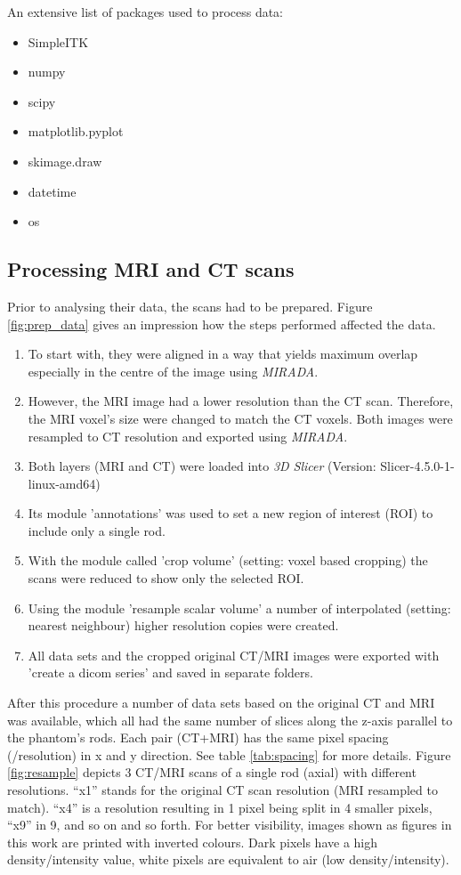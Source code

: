 An extensive list of packages used to process data:
\begin{itemize}
 \item SimpleITK
 \item numpy
 \item scipy
 \item matplotlib.pyplot \cite{Hunter2007}
 \item skimage.draw
 \item datetime
 \item os
\end{itemize}

\subsection{Processing MRI and CT scans}

Prior to analysing their data, the scans had to be prepared.
Figure \ref{fig:prep_data} gives an impression how the steps performed affected the data.

\begin{enumerate}[label=\textbf{Step \arabic*}]
\item To start with, they were aligned in a way that yields maximum overlap especially in the centre of the image using \textit{MIRADA}.
\item However, the MRI image had a lower resolution than the CT scan.
Therefore, the MRI voxel's size were changed to match the CT voxels. Both images were resampled to CT resolution and exported using \textit{MIRADA}.
\item Both layers (MRI and CT) were loaded into \textit{3D Slicer} (Version: Slicer-4.5.0-1-linux-amd64)
\item Its module 'annotations' was used to set a new region of interest (ROI) to include only a single rod.
\item With the module called 'crop volume' (setting: voxel based cropping) the scans were reduced to show only the selected ROI.
\item Using the module 'resample scalar volume' a number of interpolated (setting: nearest neighbour) higher resolution copies were created.
\item All data sets and the cropped original CT/MRI images were exported with 'create a dicom series' and saved in separate folders.
\end{enumerate}

After this procedure a number of data sets based on the original CT and MRI was available, which all had the same number of slices along the z-axis parallel to the phantom's rods.
Each pair (CT+MRI) has the same pixel spacing (/resolution) in x and y direction.
See table \ref{tab:spacing} for more details.
Figure \ref{fig:resample} depicts 3 CT/MRI scans of a single rod (axial) with different resolutions.
``x1'' stands for the original CT scan resolution (MRI resampled to match).
``x4'' is a resolution resulting in 1 pixel being split in 4 smaller pixels, ``x9'' in 9, and so on and so forth.
For better visibility, images shown as figures in this work are printed with inverted colours.
Dark pixels have a high density/intensity value, white pixels are equivalent to air (low density/intensity).

